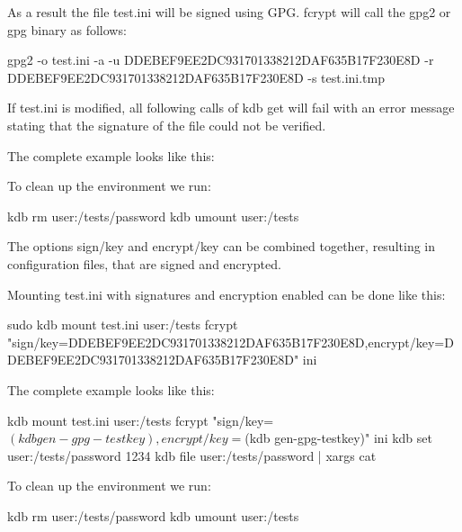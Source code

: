 As a result the file {\ttfamily test.\+ini} will be signed using G\+PG. {\ttfamily fcrypt} will call the {\ttfamily gpg2} or {\ttfamily gpg} binary as follows\+:


\begin{DoxyCode}
gpg2 -o test.ini -a -u DDEBEF9EE2DC931701338212DAF635B17F230E8D -r DDEBEF9EE2DC931701338212DAF635B17F230E8D
       -s test.ini.tmp
\end{DoxyCode}


If {\ttfamily test.\+ini} is modified, all following calls of {\ttfamily kdb get} will fail with an error message stating that the signature of the file could not be verified.

The complete example looks like this\+:




To clean up the environment we run\+:


\begin{DoxyCode}
kdb rm user:/tests/password
kdb umount user:/tests
\end{DoxyCode}


The options {\ttfamily sign/key} and {\ttfamily encrypt/key} can be combined together, resulting in configuration files, that are signed and encrypted.

Mounting {\ttfamily test.\+ini} with signatures and encryption enabled can be done like this\+:


\begin{DoxyCode}
sudo kdb mount test.ini user:/tests fcrypt
       "sign/key=DDEBEF9EE2DC931701338212DAF635B17F230E8D,encrypt/key=DDEBEF9EE2DC931701338212DAF635B17F230E8D" ini
\end{DoxyCode}


The complete example looks like this\+:


\begin{DoxyCode}
kdb mount test.ini user:/tests fcrypt "sign/key=$(kdb gen-gpg-testkey),encrypt/key=$(kdb gen-gpg-testkey)"
       ini
kdb set user:/tests/password 1234
kdb file user:/tests/password | xargs cat
\end{DoxyCode}


To clean up the environment we run\+:


\begin{DoxyCode}
kdb rm user:/tests/password
kdb umount user:/tests
\end{DoxyCode}


